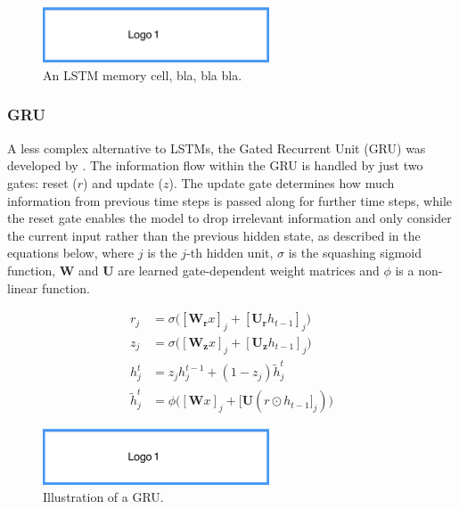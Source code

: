 \begin{figure}[htb]
 \centering
 \includegraphics[width=0.6\textwidth]{fig/logo1}
 \caption[LSTM Memory Cell]{An LSTM memory cell, bla, bla bla.}
\label{fig:memoryCellLSTM}
\end{figure}


\subsubsection{GRU}\label{GRU}
A less complex alternative to LSTMs, the Gated Recurrent Unit (GRU) was developed by \cite{Cho2014}. The information flow within the GRU is handled by just two gates: reset ($r$) and update ($z$). The update gate determines how much information from previous time steps is passed along for further time steps, while the reset gate enables the model to drop irrelevant information and only consider the current input rather than the previous hidden state, as described in the equations below, where $j$ is the $j$-th hidden unit, $\sigma$ is the squashing sigmoid function, $\boldsymbol{W}$ and $\boldsymbol{U}$ are learned gate-dependent weight matrices and $\phi$ is a non-linear function.

\begin{align*}
r_j &= \sigma \big( [\boldsymbol{W_{r}}x]_{j} + [\boldsymbol{U_{r}}h_{t-1}]_{j} \big) \\
z_j &= \sigma \big( [\boldsymbol{W_{z}}x]_{j} + [\boldsymbol{U_{z}}h_{t-1}]_{j} \big) \\
h_{j}^{t} &= z_{j}h_{j}^{t-1} + (1 - z_{j}) \tilde{h}_{j}^{t} \\
\tilde{h}_{j}^{t} &= \phi \big( [\boldsymbol{W}x]_{j} +[\boldsymbol{U}(r \odot h_{t-1}]_{j}) \big)
\end{align*}

\begin{figure}[htb]
 \centering
 \includegraphics[width=0.6\textwidth]{fig/logo1}
 \caption[Illustration of a GRU]{Illustration of a GRU.}
\label{fig:GRU}
\end{figure}

